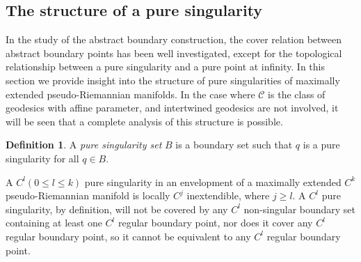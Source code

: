 \documentclass[pdflatex,sn-mathphys-num]{sn-jnl}
\newcommand{\Junbang}[1]{{\color{magenta}#1}}
\newtheorem{cor}[theorem]{Corollary}
\theoremstyle{definition}
\newtheorem{defn}[theorem]{Definition}
\begin{document}
\subsection{The structure of a pure singularity}
In the study of the abstract boundary construction, the cover relation between abstract boundary points has been well investigated, except for the topological relationship between a pure singularity and a pure point at infinity. In this section we provide insight into the structure of pure singularities of maximally extended pseudo-Riemannian manifolds. In the case where $\mathcal{C}$ is the class of geodesics with affine parameter, and intertwined geodesics are not involved, it will be seen that a complete analysis of this structure is possible.

\begin{defn}
    A {\it pure singularity set} $B$ is a boundary set such that $q$ is a pure singularity for all $q \in B$.
\end{defn}


A $C^l (0 \leq l \leq k)$ pure singularity in an envelopment of a maximally extended $C^k$ pseudo-Riemannian manifold is locally $C^j$ inextendible, where $ j \geq l$. A $C^l$ pure singularity, by definition, will not be covered by any $C^l$ non-singular boundary set containing at least one $C^l$ regular boundary point, nor does it cover any $C^l$ regular boundary point, so it cannot be equivalent to any $C^l$ regular boundary point.
\end{document}
